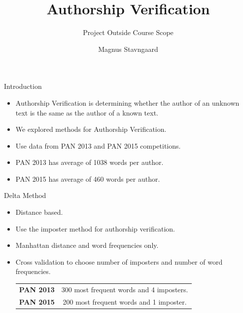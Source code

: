 \documentclass[10pt]{beamer}
\title{Authorship Verification}
\subtitle{Project Outside Course Scope}
\date{}
\author{Magnus Stavngaard}
\institute{University of Copenhagen}
\begin{document}
\maketitle

\begin{frame}[fragile]{Introduction}

    \begin{itemize}
        \item Authorship Verification is determining whether the author of an
            unknown text is the same as the author of a known text.
        \item We explored methods for Authorship Verification.
        \item Use data from PAN 2013 and PAN 2015 competitions.
        \item PAN 2013 has average of 1038 words per author.
        \item PAN 2015 has average of 460 words per author.
    \end{itemize}

\end{frame}

\begin{frame}[fragile]{Delta Method}
    \begin{itemize}
        \item Distance based.
        \item Use the imposter method for authorship verification.
        \item Manhattan distance and word frequencies only.
        \item Cross validation to choose number of imposters and number of word
            frequencies.

        \begin{table}
        \begin{tabular}{cc}
            \textbf{PAN 2013} & 300 most frequent words and 4 imposters. \\
            \textbf{PAN 2015} & 200 most frequent words and 1 imposter.
        \end{tabular}
        \end{table}
    \end{itemize}
\end{frame}


\end{document}

